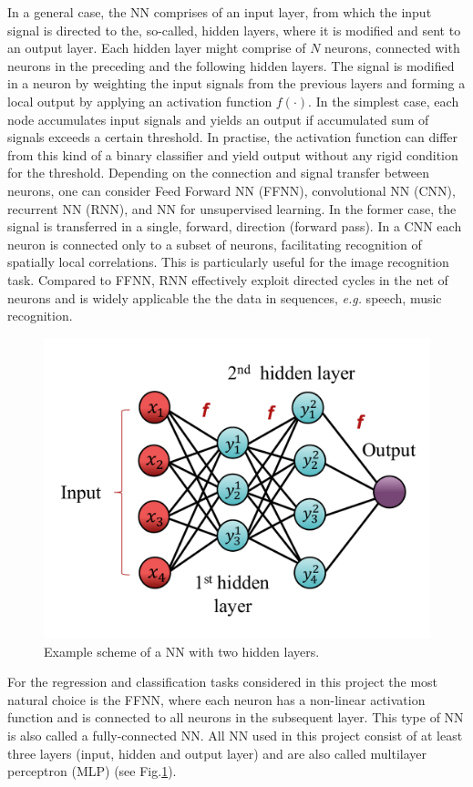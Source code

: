 \documentclass{emulateapj}
\begin{document}
In a general case, the NN comprises of an input layer, from which the input signal is directed to the, so-called, hidden layers, where it is modified and sent to an output layer. Each hidden layer might comprise of $N$ neurons, connected with neurons in the preceding and the following hidden layers. The signal is modified in a neuron by weighting the input signals from the previous layers and forming a local output by applying an activation function $f(\cdot)$. In the simplest case, each node accumulates input signals and yields an output if accumulated sum of signals exceeds a certain threshold. In practise, the activation function can differ from this kind of a binary classifier and yield output without any rigid condition for the threshold. Depending on the connection and signal transfer between neurons, one can consider Feed Forward NN (FFNN), convolutional NN (CNN), recurrent NN (RNN), and NN for unsupervised learning. In the former case, the signal is transferred in a single, forward, direction (forward pass). In a CNN each neuron is connected only to a subset of neurons, facilitating recognition of spatially local correlations. This is particularly useful for the image recognition task. Compared to FFNN, RNN effectively exploit directed cycles in the net of neurons and is widely applicable the the data in sequences, \textit{e.g.} speech, music recognition. 

\begin{figure}[h]
    \centering
    \includegraphics[width=.39\textwidth]{Figures/NN.pdf}
    \caption{Example scheme of a NN with two hidden layers.}
    \label{fig:NN}
\end{figure}

For the regression and classification tasks considered in this project the most natural choice is the FFNN, where each neuron has a non-linear activation function and is connected to all neurons in the subsequent layer. This type of NN is also called a fully-connected NN. All NN used in this project consist of at least three layers (input, hidden and output layer) and are also called multilayer perceptron (MLP) (see Fig.\ref{fig:NN}).
\end{document}
